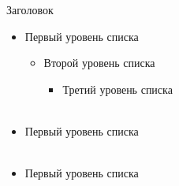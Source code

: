 \documentclass[14pt]{beamer}
\begin{document}
\begin{frame}{Заголовок}
    \begin{itemize}
        \item Первый уровень списка
            \begin{itemize}
                \item Второй уровень списка
                    \begin{itemize}
                        \item Третий уровень списка\\
                            ~
                    \end{itemize}
            \end{itemize}
        \item Первый уровень списка\\
            ~
        \item Первый уровень списка\\
            ~
    \end{itemize}
\end{frame}

\begin{frame}[nologo]
\end{frame}

\itmothankyou
\end{document}
